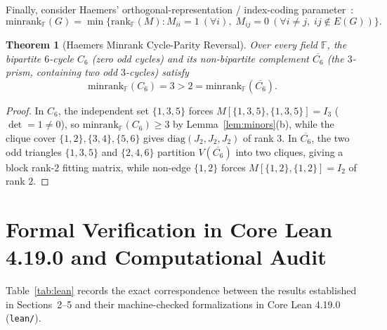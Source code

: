 \documentclass[11pt]{article}
\newtheorem{theorem}{Theorem}[section]
\theoremstyle{definition}
\newcommand{\F}{\mathbb{F}}
\newcommand{\minrank}{\mathrm{minrank}}
\newcommand{\rk}{\mathrm{rank}}
\begin{document}
Finally, consider Haemers' orthogonal-representation / index-coding parameter~\cite{Haemers1979,Peeters1996}:
\[
\minrank_{\F}(G) = \min\{\rk_{\F}(M) : M_{ii} = 1\ (\forall i),\; M_{ij} = 0\ (\forall i\neq j,\; ij\notin E(G))\}.
\]

\begin{theorem}[Haemers Minrank Cycle-Parity Reversal]\label{thm:haemers}
Over every field $\F$, the bipartite $6$-cycle $C_6$ (zero odd cycles) and its non-bipartite complement $\overline{C_6}$ (the $3$-prism, containing two odd $3$-cycles) satisfy
\[
\minrank_{\F}(C_6) = 3 > 2 = \minrank_{\F}(\overline{C_6}).
\]
\end{theorem}
\begin{proof}
In $C_6$, the independent set $\{1,3,5\}$ forces $M[\{1,3,5\},\{1,3,5\}] = I_3$ ($\det = 1 \neq 0$), so $\minrank_{\F}(C_6)\ge 3$ by Lemma~\ref{lem:minors}(b), while the clique cover $\{1,2\},\{3,4\},\{5,6\}$ gives $\mathrm{diag}(J_2,J_2,J_2)$ of rank $3$. In $\overline{C_6}$, the two odd triangles $\{1,3,5\}$ and $\{2,4,6\}$ partition $V(\overline{C_6})$ into two cliques, giving a block rank-$2$ fitting matrix, while non-edge $\{1,2\}$ forces $M[\{1,2\},\{1,2\}]=I_2$ of rank $2$.
\end{proof}

\section{Formal Verification in Core Lean 4.19.0 and Computational Audit}

Table~\ref{tab:lean} records the exact correspondence between the results established in Sections~2--5 and their machine-checked formalizations in Core Lean 4.19.0 (\texttt{lean/}).
\end{document}
